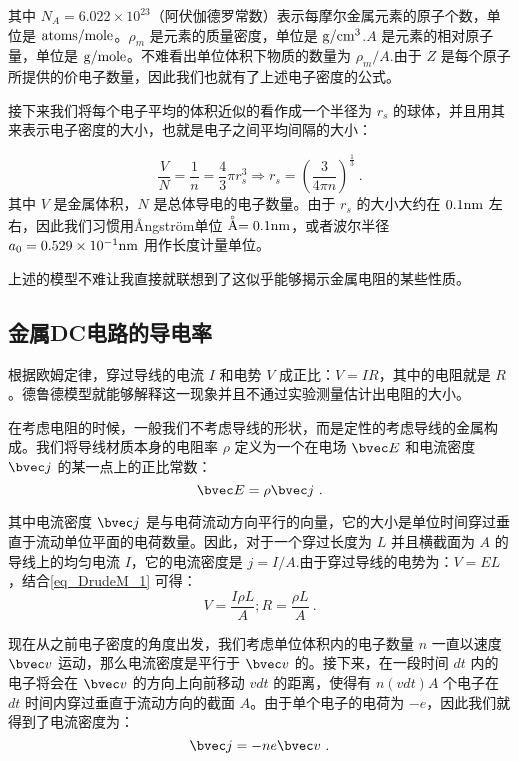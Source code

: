 其中 $N_A=6.022\times 10^{23}$（阿伏伽德罗常数）表示每摩尔金属元素的原子个数，单位是 $\rm{atoms/mole}$。$\rho_m$ 是元素的质量密度，单位是 $\rm{g/cm^3}$.$A$ 是元素的相对原子量，单位是 $\rm{g/mole}$。不难看出单位体积下物质的数量为 $\rho_m/A$.由于 $Z$ 是每个原子所提供的价电子数量，因此我们也就有了上述电子密度的公式。

接下来我们将每个电子平均的体积近似的看作成一个半径为 $r_s$ 的球体，并且用其来表示电子密度的大小，也就是电子之间平均间隔的大小：

\begin{equation}
\frac{V}{N}=\frac{1}{n}=\frac{4}{3}\pi r_s^3 \Rightarrow r_s=\left(\frac{3}{4\pi n}\right)^\frac{1}{3}~.
\end{equation}
其中 $V$ 是金属体积，$N$ 是总体导电的电子数量。由于 $r_s$ 的大小大约在 $0.1\rm{nm}$ 左右，因此我们习惯用Ångström单位 $\buildrel _{\circ} \over {\mathrm{A}}=0.1\rm{nm}$，或者波尔半径 $a_0=0.529\times 10^{-1}\rm{nm}$ 用作长度计量单位。

上述的模型不难让我直接就联想到了这似乎能够揭示金属电阻的某些性质。

\subsection{金属DC电路的导电率}

根据欧姆定律，穿过导线的电流 $I$ 和电势 $V$ 成正比：$V=IR$，其中的电阻就是 $R$。德鲁德模型就能够解释这一现象并且不通过实验测量估计出电阻的大小。

在考虑电阻的时候，一般我们不考虑导线的形状，而是定性的考虑导线的金属构成。我们将导线材质本身的电阻率 $\rho$ 定义为一个在电场 $\bvec E$ 和电流密度 $\bvec j$ 的某一点上的正比常数：
\begin{equation}\label{eq_DrudeM_1}
\bvec E =\rho \bvec j~.
\end{equation}

其中电流密度 $\bvec j$ 是与电荷流动方向平行的向量，它的大小是单位时间穿过垂直于流动单位平面的电荷数量。因此，对于一个穿过长度为 $L$ 并且横截面为 $A$ 的导线上的均匀电流 $I$，它的电流密度是 $j=I/A$.由于穿过导线的电势为：$V=EL$，结合\autoref{eq_DrudeM_1} 可得：
\begin{equation}
V=\frac{I\rho L}{A}; R = \frac{\rho L}{A}~.
\end{equation}

现在从之前电子密度的角度出发，我们考虑单位体积内的电子数量 $n$ 一直以速度 $\bvec v$ 运动，那么电流密度是平行于 $\bvec v$ 的。接下来，在一段时间 $dt$ 内的电子将会在 $\bvec v$ 的方向上向前移动 $v dt$ 的距离，使得有 $n(v dt)A$ 个电子在 $dt$ 时间内穿过垂直于流动方向的截面 $A$。由于单个电子的电荷为 $-e$，因此我们就得到了电流密度为：
\begin{equation}\label{eq_DrudeM_2}
\bvec j = -ne\bvec v~.
\end{equation}

